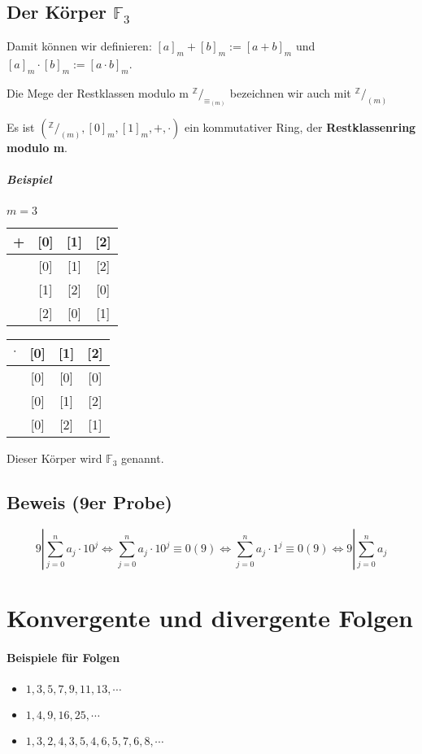 \documentclass[14pt,a4paper]{article}
\newcommand*\rfrac[2]{{}^{#1}\!/_{#2}}
\newcommand{\Z}{\ensuremath{\mathbb{Z}}}
\begin{document}
  \subsection{Der Körper $\mathbb{F}_3$}

  Damit können wir definieren: $ [a]_m + [b]_m := [a + b]_m$ und $[a]_m \cdot [b]_m
  := [ a \cdot b ]_m$.

  Die Mege der Restklassen modulo m $ \rfrac{\Z}{\equiv_{(m)}} $ bezeichnen wir auch
  mit $ \rfrac{\Z}{(m)}$

  Es ist $ \left( \rfrac{\Z}{(m)}, [0]_m, [1]_m, +, \cdot \right) $ ein kommutativer Ring,
  der \textbf{Restklassenring modulo m}.

  \subparagraph{Beispiel}
  $m=3$

  \begin{tabular}{c || c | c | c}
     +  & [0] & [1] & [2] \\ \hline \hline
    [0] & [0] & [1] & [2] \\ \hline
    [1] & [1] & [2] & [0] \\ \hline
    [2] & [2] & [0] & [1]
  \end{tabular}
  \begin{tabular}{c || c | c | c}
    $\cdot$ & [0] & [1] & [2] \\ \hline \hline
    [0] & [0] & [0] & [0] \\ \hline
    [1] & [0] & [1] & [2] \\ \hline
    [2] & [0] & [2] & [1]
  \end{tabular}

  Dieser Körper wird $\mathbb{F}_3$ genannt.

  \subsection{Beweis (9er Probe)}
  $$ 9 | \sum_{j=0}^n a_j \cdot 10^j \Leftrightarrow \sum_{j=0}^n a_j \cdot
  10^j \equiv 0 (9) \Leftrightarrow \sum_{j=0}^n a_j \cdot 1^j \equiv 0 (9)
  \Leftrightarrow 9 | \sum_{j=0}^n a_j  $$

  \section{Konvergente und divergente Folgen}
  \paragraph{Beispiele für Folgen}
  \begin{itemize}
    \item $1,3,5,7,9,11,13, \dotsb$
    \item $1,4,9,16,25, \dotsb$
    \item $1,3,2,4,3,5,4,6,5,7,6,8, \dotsb$
  \end{itemize}
\end{document}
